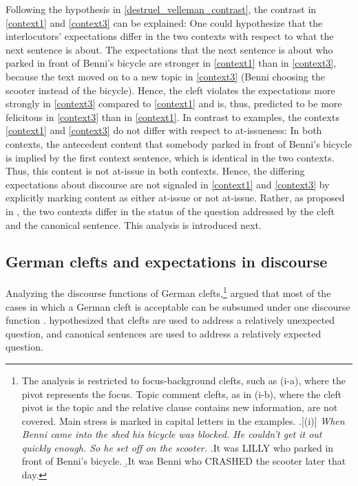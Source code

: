 \documentclass{salt}
\begin{document}
Following the hypothesis in \ref{destruel_velleman_contrast}, the contrast in \ref{context1} and \ref{context3} can be explained: One could hypothesize that the interlocutors' expectations differ in the two contexts with respect to what the next sentence is about. The expectations that the next sentence is about who parked in front of Benni's bicycle are stronger in \ref{context1} than in \ref{context3}, because the text moved on to a new topic in \ref{context3} (Benni choosing the scooter instead of the bicycle). Hence, the cleft violates the expectations more strongly in \ref{context3} compared to \ref{context1} and is, thus, predicted to be more felicitous in \ref{context3} than in \ref{context1}. In contrast to  examples, the contexts \ref{context1} and \ref{context3} do not differ with respect to at-issueness: In both contexts, the antecedent content that somebody parked in front of Benni's bicycle is implied by the first context sentence, which is identical in the two contexts. Thus, this content is not at-issue in both contexts. Hence, the differing expectations about discourse are not signaled in \ref{context1} and \ref{context3} by explicitly marking content as either at-issue or not at-issue. Rather, as proposed in \cite{tonnis_2021}, the two contexts differ in the status of the question addressed by the cleft and the canonical sentence. This analysis is introduced next.


\subsection{German clefts and expectations in discourse}
\label{subsec:expect}


Analyzing the discourse functions of German clefts,\footnote{The analysis is restricted to focus-background clefts, such as (i-a), where the pivot represents the focus. Topic comment clefts, as in (i-b), where the cleft pivot is the topic and the relative clause contains new information, are not covered. Main stress is marked in capital letters in the examples.
\ex.[(i)] \textit{When Benni came into the shed his bicycle was blocked. He couldn't get it out quickly enough. So he set off on the scooter.}
\a.\label{fb_cleft}It was LILLY who parked in front of Benni's bicycle.
\b.\label{tc_cleft}It was Benni who CRASHED the scooter later that day.

}
\cite{tonnis_2021} argued that most of the cases in which a German cleft is acceptable can be subsumed under one discourse function \cite[a related analysis is presented by][]{delin_oberlander_1995}. \citeauthor{tonnis_2021} hypothesized that clefts are used to address a relatively unexpected question, and canonical sentences are used to address a relatively expected question. 
\end{document}
